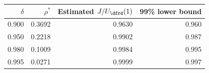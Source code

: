 \begin{tabular}{rrrr}
\hline
$\delta$ & $\rho^*$ & Estimated $J/U_{\dfrd}(1)$ & 99\% lower bound \\
\hline
0.900 & 0.3692 & 0.9630 & 0.960 \\
0.950 & 0.2218 & 0.9902 & 0.987 \\
0.980 & 0.1009 & 0.9984 & 0.995 \\
0.995 & 0.0271 & 0.9999 & 0.997 \\
\hline
\end{tabular}
